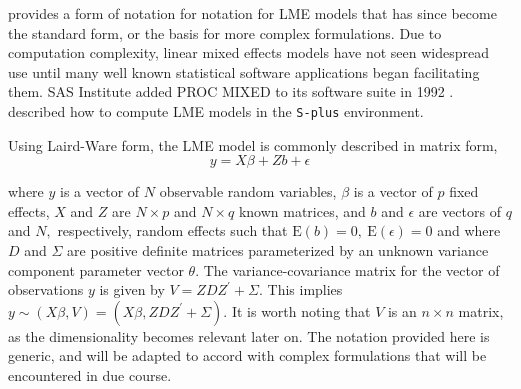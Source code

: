 \documentclass[12pt, a4paper]{report}
\theoremstyle{plain}
\theoremstyle{definition}
\theoremstyle{remark}
\begin{document}
	\citet{LW82} provides a form of notation for notation for LME models that has since become the standard form, or the basis for more complex formulations. Due to computation complexity, linear mixed effects models have not seen widespread use until many well known statistical software applications began facilitating them. SAS Institute added PROC MIXED to its software suite in 1992 \citep{singer}. \citet{PB} described how to compute LME models in the \texttt{S-plus} environment.
	
	Using Laird-Ware form, the LME model is commonly described in matrix form,
	\begin{equation}
	y = X\beta + Zb + \epsilon
	\label{LW}
	\end{equation}
	
	\noindent where $y$ is a vector of $N$ observable random variables, $\beta$ is a vector of $p$ fixed effects, $X$ and $Z$ are $N \times p$ and $N \times q$ known matrices, and $b$ and $\epsilon$  are vectors of $q$ and $N,$ respectively, random effects such that $\mathrm{E}(b)=0, \ \mathrm{E}(\epsilon)=0$
	and
	where $D$ and $\Sigma$ are positive definite matrices parameterized by an unknown variance component parameter vector $ \theta.$ The variance-covariance matrix for the vector of observations $y$ is given by $V = ZDZ^{\prime}+ \Sigma.$ This implies $y \sim(X\beta, V) = (X\beta,ZDZ^{\prime}+ \Sigma)$. It is worth noting that $V$ is an $n \times n$ matrix, as the dimensionality becomes relevant later on. The notation provided here is generic, and will be adapted to accord with complex formulations that will be encountered in due course.
	
	
	
	
\end{document}
